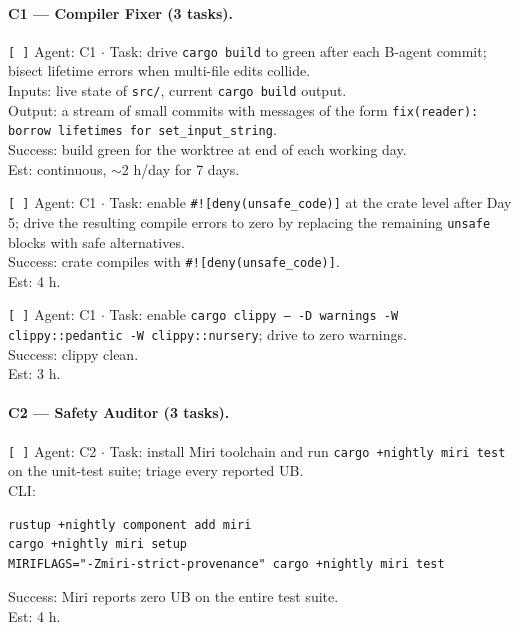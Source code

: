 \documentclass[12pt]{article}
\theoremstyle{definition}
\theoremstyle{remark}
\begin{document}
\paragraph{C1 --- Compiler Fixer (3 tasks).}

\begin{flushleft}
\texttt{[\,]} Agent: C1 \(\cdot\) Task: drive \texttt{cargo build} to
green after each B-agent commit; bisect lifetime errors when
multi-file edits collide.
\\
\quad Inputs: live state of \texttt{src/}, current \texttt{cargo build}
output.
\\
\quad Output: a stream of small commits with messages of the form
\texttt{fix(reader): borrow lifetimes for set\_input\_string}.
\\
\quad Success: build green for the worktree at end of each working day.
\\
\quad Est: continuous, $\sim$2 h/day for 7 days.
\end{flushleft}

\begin{flushleft}
\texttt{[\,]} Agent: C1 \(\cdot\) Task: enable
\texttt{\#![deny(unsafe\_code)]} at the crate level after Day 5; drive
the resulting compile errors to zero by replacing the remaining
\texttt{unsafe} blocks with safe alternatives.
\\
\quad Success: crate compiles with \texttt{\#![deny(unsafe\_code)]}.
\\
\quad Est: 4 h.
\end{flushleft}

\begin{flushleft}
\texttt{[\,]} Agent: C1 \(\cdot\) Task: enable
\texttt{cargo clippy -- -D warnings -W clippy::pedantic
-W clippy::nursery}; drive to zero warnings.
\\
\quad Success: clippy clean.
\\
\quad Est: 3 h.
\end{flushleft}

\paragraph{C2 --- Safety Auditor (3 tasks).}

\begin{flushleft}
\texttt{[\,]} Agent: C2 \(\cdot\) Task: install Miri toolchain and run
\texttt{cargo +nightly miri test} on the unit-test suite; triage every
reported UB.
\\
\quad CLI:
\begin{verbatim}
rustup +nightly component add miri
cargo +nightly miri setup
MIRIFLAGS="-Zmiri-strict-provenance" cargo +nightly miri test
\end{verbatim}
\quad Success: Miri reports zero UB on the entire test suite.
\\
\quad Est: 4 h.
\end{flushleft}
\end{document}

